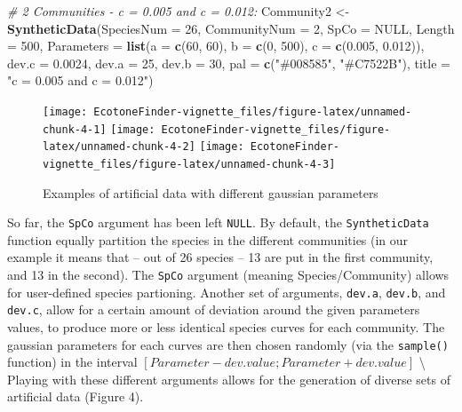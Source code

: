 \documentclass[
]{article}
\newenvironment{Shaded}{\begin{snugshade}}{\end{snugshade}}
\newcommand{\CommentTok}[1]{\textcolor[rgb]{0.56,0.35,0.01}{\textit{#1}}}
\newcommand{\DataTypeTok}[1]{\textcolor[rgb]{0.13,0.29,0.53}{#1}}
\newcommand{\DecValTok}[1]{\textcolor[rgb]{0.00,0.00,0.81}{#1}}
\newcommand{\FloatTok}[1]{\textcolor[rgb]{0.00,0.00,0.81}{#1}}
\newcommand{\KeywordTok}[1]{\textcolor[rgb]{0.13,0.29,0.53}{\textbf{#1}}}
\newcommand{\NormalTok}[1]{#1}
\newcommand{\OtherTok}[1]{\textcolor[rgb]{0.56,0.35,0.01}{#1}}
\newcommand{\StringTok}[1]{\textcolor[rgb]{0.31,0.60,0.02}{#1}}
\begin{document}
\begin{Shaded}
\begin{Highlighting}[]
\CommentTok{\# 2 Communities {-} c = 0.005 and c = 0.012:}
\NormalTok{Community2 \textless{}{-}}\StringTok{ }\KeywordTok{SyntheticData}\NormalTok{(}\DataTypeTok{SpeciesNum =} \DecValTok{26}\NormalTok{, }\DataTypeTok{CommunityNum =} \DecValTok{2}\NormalTok{, }\DataTypeTok{SpCo =} \OtherTok{NULL}\NormalTok{, }
    \DataTypeTok{Length =} \DecValTok{500}\NormalTok{, }\DataTypeTok{Parameters =} \KeywordTok{list}\NormalTok{(}\DataTypeTok{a =} \KeywordTok{c}\NormalTok{(}\DecValTok{60}\NormalTok{, }\DecValTok{60}\NormalTok{), }\DataTypeTok{b =} \KeywordTok{c}\NormalTok{(}\DecValTok{0}\NormalTok{, }\DecValTok{500}\NormalTok{), }\DataTypeTok{c =} \KeywordTok{c}\NormalTok{(}\FloatTok{0.005}\NormalTok{, }
        \FloatTok{0.012}\NormalTok{)), }\DataTypeTok{dev.c =} \FloatTok{0.0024}\NormalTok{, }\DataTypeTok{dev.a =} \DecValTok{25}\NormalTok{, }\DataTypeTok{dev.b =} \DecValTok{30}\NormalTok{, }\DataTypeTok{pal =} \KeywordTok{c}\NormalTok{(}\StringTok{"\#008585"}\NormalTok{, }
        \StringTok{"\#C7522B"}\NormalTok{), }\DataTypeTok{title =} \StringTok{"c = 0.005 and c = 0.012"}\NormalTok{)}
\end{Highlighting}
\end{Shaded}

\begin{figure}
\texttt{[image: EcotoneFinder-vignette\_files/figure-latex/unnamed-chunk-4-1]} \texttt{[image: EcotoneFinder-vignette\_files/figure-latex/unnamed-chunk-4-2]} \texttt{[image: EcotoneFinder-vignette\_files/figure-latex/unnamed-chunk-4-3]} \caption{Examples of artificial data with different gaussian parameters}\label{fig:unnamed-chunk-4}
\end{figure}

So far, the \texttt{SpCo} argument has been left \texttt{NULL}. By
default, the \texttt{SyntheticData} function equally partition the
species in the different communities (in our example it means that --
out of 26 species -- 13 are put in the first community, and 13 in the
second). The \texttt{SpCo} argument (meaning Species/Community) allows
for user-defined species partioning. Another set of arguments,
\texttt{dev.a}, \texttt{dev.b}, and \texttt{dev.c}, allow for a certain
amount of deviation around the given parameters values, to produce more
or less identical species curves for each community. The gaussian
parameters for each curves are then chosen randomly (via the
\texttt{sample()} function) in the interval
\([Parameter - dev.value ; Parameter + dev.value]\) \textbackslash{}
Playing with these different arguments allows for the generation of
diverse sets of artificial data (Figure 4).
\end{document}
